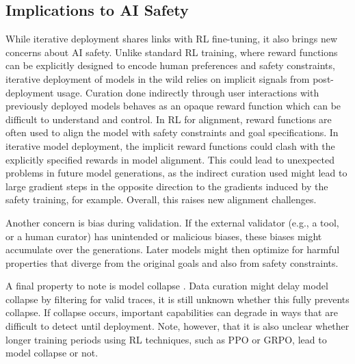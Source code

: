 \subsection{Implications to AI Safety}

While iterative deployment shares links with RL fine-tuning, it also brings
new concerns about AI safety. Unlike standard RL training, where reward functions can be explicitly
designed to encode human preferences and safety constraints, iterative
deployment of models in the wild relies on implicit signals from post-deployment usage. Curation done indirectly through user interactions with previously deployed models behaves as an opaque reward
function which can be difficult to understand and control.
In RL
for alignment, reward functions are often used to align the model with safety
constraints and goal specifications. In iterative model deployment, the implicit reward
functions could clash with the explicitly specified rewards in
model alignment. This could lead to unexpected problems in future model
generations, as the indirect curation used might lead to large gradient steps in the opposite direction to the gradients induced by the safety training, for example.
Overall, this raises new alignment challenges.


Another concern is bias during validation. If the external validator (e.g., a tool,
or a human curator) has unintended or malicious biases, these biases might
accumulate over the generations. Later models might then optimize for harmful
properties that diverge from the original goals and also from safety
constraints.

A final property to note is model collapse \citep{shumailov-et-al-nature2024}. Data
curation might delay model collapse by filtering for valid traces, it is still
unknown whether this fully prevents collapse. If collapse
occurs, important capabilities can degrade in ways that are difficult to
detect until deployment. Note, however, that it is also unclear whether
longer training periods using RL techniques, such as PPO or GRPO, lead to model
collapse or not.
